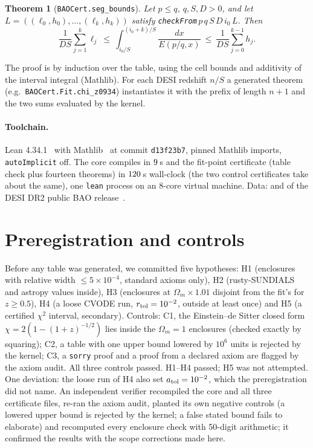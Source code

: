 \documentclass[11pt]{article}
\newtheorem{theorem}{Theorem}
\theoremstyle{remark}
\begin{document}
\begin{theorem}[\texttt{BAOCert.seg\_bounds}]
Let $p\le q$, $q,S,D>0$, and let $L=((\ell_0,h_0),\dots,(\ell_k,h_k))$ satisfy \texttt{checkFrom}$\,p\,q\,S\,D\,i_0\,L$. Then
\[ \frac{1}{DS}\sum_{j=1}^{k}\ell_j\ \le\ \int_{i_0/S}^{(i_0+k)/S}\frac{dx}{E(p/q,x)}\ \le\ \frac{1}{DS}\sum_{j=0}^{k-1}h_j .\]
\end{theorem}
The proof is by induction over the table, using the cell bounds and additivity of the interval integral (Mathlib). For each
DESI redshift $n/S$ a generated theorem (e.g.\ \texttt{BAOCert.Fit.chi\_z0934}) instantiates it with the prefix of length $n+1$ and
the two sums evaluated by the kernel.

\paragraph{Toolchain.} Lean 4.34.1~\cite{lean} with Mathlib~\cite{mathlib} at commit \texttt{d13f23b7}, pinned Mathlib imports,
\texttt{autoImplicit} off. The core compiles in $9$\,s and the fit-point certificate (table check plus fourteen theorems)
in $120$\,s wall-clock (the two control certificates take about the same), one \texttt{lean} process on an 8-core virtual machine.
Data:  and  of the DESI DR2 public BAO release~\cite{desi}.

\section{Preregistration and controls}
Before any table was generated, we committed five hypotheses: H1 (enclosures with relative width $\le5\times10^{-4}$, standard axioms
only), H2 (rusty-SUNDIALS and astropy values inside), H3 (enclosures at $\Omega_m\times1.01$ disjoint from the fit's for $z\ge0.5$),
H4 (a loose CVODE run, $r_{\rm tol}=10^{-2}$, outside at least once) and H5 (a certified $\chi^2$ interval, secondary). Controls: C1, the Einstein--de Sitter
closed form $\chi=2(1-(1+z)^{-1/2})$ lies inside the $\Omega_m=1$ enclosures (checked exactly by squaring); C2, a table with one upper
bound lowered by $10^6$ units is rejected by the kernel; C3, a \texttt{sorry} proof and a proof from a declared axiom are flagged by the
axiom audit. All three controls passed. H1--H4 passed; H5 was not attempted. One deviation: the loose run of H4 also set
$a_{\rm tol}=10^{-2}$, which the preregistration did not name. An independent verifier recompiled the core and all three certificate files, re-ran the axiom
audit, planted its own negative controls (a lowered upper bound is rejected by the kernel; a false stated bound fails to elaborate)
and recomputed every enclosure check with 50-digit arithmetic; it confirmed the results with the scope corrections made here.
\end{document}
